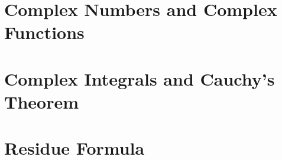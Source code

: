 \documentclass{report}
\begin{document}
	
	\thispagestyle{empty}
	\newpage%
	\tableofcontents
  

  \chapter{Complex Numbers and Complex Functions}
  
  \chapter{Complex Integrals and Cauchy's Theorem}
  
  \chapter{Residue Formula}
  
\end{document}
